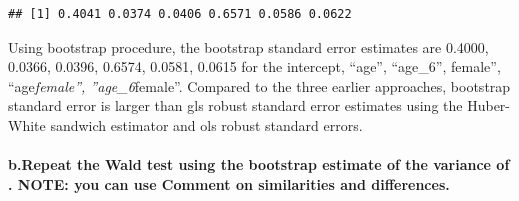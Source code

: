 \documentclass[
]{article}
\begin{document}
\begin{verbatim}
## [1] 0.4041 0.0374 0.0406 0.6571 0.0586 0.0622
\end{verbatim}

Using bootstrap procedure, the bootstrap standard error estimates are
0.4000, 0.0366, 0.0396, 0.6574, 0.0581, 0.0615 for the intercept,
``age'', ``age\_6'', female'', ``age\emph{female'', ''age\_6}female''.
Compared to the three earlier approaches, bootstrap standard error is
larger than gls robust standard error estimates using the Huber-White
sandwich estimator and ols robust standard errors.

\hypertarget{b.repeat-the-wald-test-using-the-bootstrap-estimate-of-the-variance-of-.-note-you-can-use-comment-on-similarities-and-differences.}{%
\paragraph{b.Repeat the Wald test using the bootstrap estimate of the
variance of . NOTE: you can use Comment on similarities and
differences.}\label{b.repeat-the-wald-test-using-the-bootstrap-estimate-of-the-variance-of-.-note-you-can-use-comment-on-similarities-and-differences.}}
\end{document}
